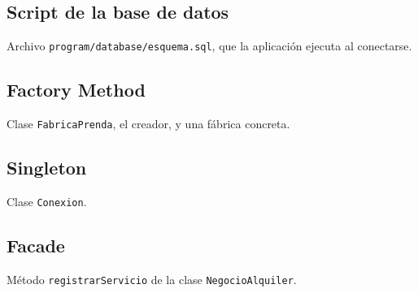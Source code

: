%
%


\subsection{Script de la base de datos}

Archivo \texttt{program/database/esquema.sql}, que la aplicación ejecuta al conectarse.



\subsection{Factory Method}

Clase \texttt{FabricaPrenda}, el creador, y una fábrica concreta.





\subsection{Singleton}

Clase \texttt{Conexion}.



\subsection{Facade}

Método \texttt{registrarServicio} de la clase \texttt{NegocioAlquiler}.



